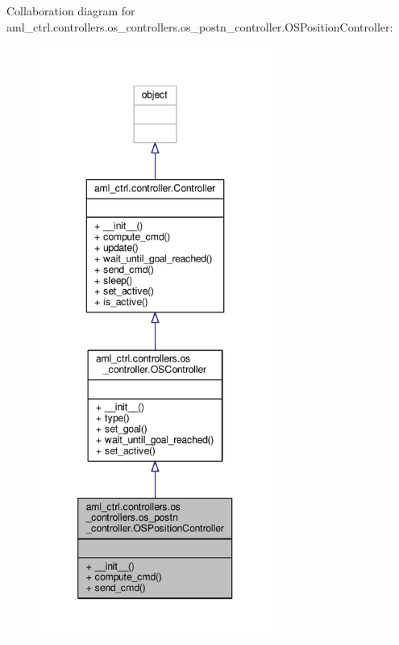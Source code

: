 Collaboration diagram for aml\-\_\-ctrl.\-controllers.\-os\-\_\-controllers.\-os\-\_\-postn\-\_\-controller.\-O\-S\-Position\-Controller\-:
\nopagebreak
\begin{figure}[H]
\begin{center}
\leavevmode
\includegraphics[height=550pt]{classaml__ctrl_1_1controllers_1_1os__controllers_1_1os__postn__controller_1_1_o_s_position_controller__coll__graph}
\end{center}
\end{figure}
